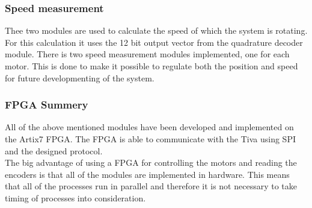 \documentclass[../../../main]{subfiles}
\begin{document}
\subsubsection{Speed measurement}
Thee two modules are used to calculate the speed of which the system is rotating. For this calculation it uses the 12 bit output vector from the quadrature decoder module.
There is two speed measurement modules implemented, one for each motor.
This is done to make it possible to regulate both the position and speed for future developmenting of the system.

\subsubsection{FPGA Summery}
All of the above mentioned modules have been developed and implemented on the Artix7 FPGA.
The FPGA is able to communicate with the Tiva using SPI and the designed protocol.
\\
The big advantage of using a FPGA for controlling the motors and reading the encoders is that all of the modules are implemented in hardware.
This means that all of the processes run in parallel and therefore it is not necessary to take timing of processes into consideration.
\end{document}
